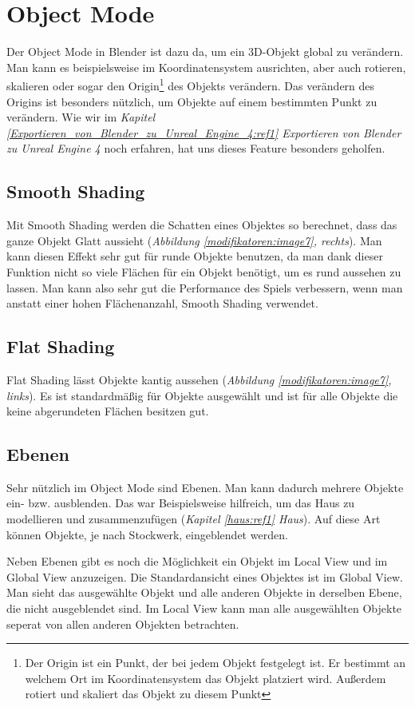 \section{Object Mode}
Der Object Mode in Blender ist dazu da, um ein 3D-Objekt global zu verändern. Man kann es beispielsweise im Koordinatensystem ausrichten, aber
auch rotieren, skalieren oder sogar den Origin\footnote{Der Origin ist ein Punkt, der bei jedem Objekt festgelegt ist. Er bestimmt an welchem Ort im Koordinatensystem das Objekt platziert wird. Außerdem rotiert und skaliert das Objekt zu diesem Punkt}
des Objekts verändern. Das verändern des Origins ist besonders nützlich, um Objekte auf einem bestimmten Punkt zu verändern.
Wie wir im \textit{Kapitel \ref{Exportieren_von_Blender_zu_Unreal_Engine_4:ref1} \dq Exportieren von Blender zu Unreal Engine 4\dq} noch erfahren, hat uns dieses Feature besonders geholfen.

\subsection{Smooth Shading}
\label{objectMode:smoothshading}
Mit Smooth Shading werden die Schatten eines Objektes so berechnet, dass das ganze Objekt Glatt aussieht (\textit{Abbildung \ref{modifikatoren:image7}, rechts}).\citep{smoothshading:link}
Man kann diesen Effekt sehr gut für runde Objekte benutzen, da man dank dieser Funktion nicht so viele Flächen für ein Objekt benötigt, um
es rund aussehen zu lassen. Man kann also sehr gut die Performance des Spiels verbessern, wenn man anstatt einer hohen Flächenanzahl, Smooth Shading verwendet.

\subsection{Flat Shading}
Flat Shading lässt Objekte kantig aussehen (\textit{Abbildung \ref{modifikatoren:image7}, links}).
Es ist standardmäßig für Objekte ausgewählt und ist für alle Objekte die keine abgerundeten Flächen besitzen gut.

\subsection{Ebenen}
Sehr nützlich im Object Mode sind Ebenen. Man kann dadurch mehrere Objekte ein- bzw. ausblenden.
Das war Beispielsweise hilfreich, um das Haus zu modellieren und zusammenzufügen (\textit{Kapitel \ref{haus:ref1} \dq Haus\dq}).
Auf diese Art können Objekte, je nach Stockwerk, eingeblendet werden.

Neben Ebenen gibt es noch die Möglichkeit ein Objekt im Local View und im Global View anzuzeigen.
Die Standardansicht eines Objektes ist im Global View. Man sieht das ausgewählte Objekt und alle anderen Objekte in derselben Ebene, die nicht ausgeblendet sind.
Im Local View kann man alle ausgewählten Objekte seperat von allen anderen Objekten betrachten.
